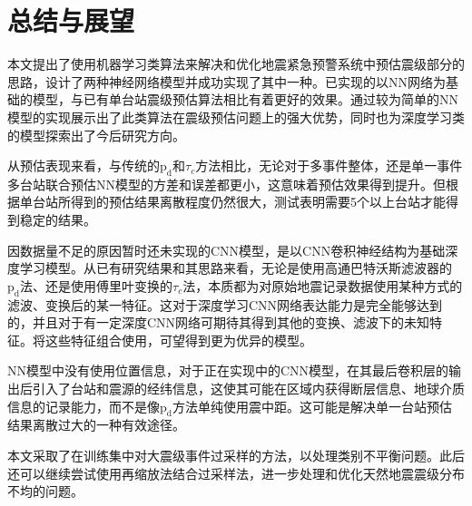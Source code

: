 \chapter{总结与展望}
\indent 本文提出了使用机器学习类算法来解决和优化地震紧急预警系统中预估震级部分的思路，设计了两种神经网络模型并成功实现了其中一种。已实现的以NN网络为基础的模型，与已有单台站震级预估算法相比有着更好的效果。通过较为简单的NN模型的实现展示出了此类算法在震级预估问题上的强大优势，同时也为深度学习类的模型探索出了今后研究方向。

\indent 从预估表现来看，与传统的$\mathrm{p}_{\mathrm{d}}$和$\tau_{c}$方法相比，无论对于多事件整体，还是单一事件多台站联合预估NN模型的方差和误差都更小，这意味着预估效果得到提升。但根据单台站所得到的预估结果离散程度仍然很大，测试表明需要5个以上台站才能得到稳定的结果。

\indent 因数据量不足的原因暂时还未实现的CNN模型，是以CNN卷积神经结构为基础深度学习模型。从已有研究结果和其思路来看，无论是使用高通巴特沃斯滤波器的$\mathrm{p}_{\mathrm{d}}$法、还是使用傅里叶变换的$\tau_{c}$法，本质都为对原始地震记录数据使用某种方式的滤波、变换后的某一特征。这对于深度学习CNN网络表达能力是完全能够达到的，并且对于有一定深度CNN网络可期待其得到其他的变换、滤波下的未知特征。将这些特征组合使用，可望得到更为优异的模型。

\indent NN模型中没有使用位置信息，对于正在实现中的CNN模型，在其最后卷积层的输出后引入了台站和震源的经纬信息，这使其可能在区域内获得断层信息、地球介质信息的记录能力，而不是像$\mathrm{p}_{\mathrm{d}}$方法单纯使用震中距。这可能是解决单一台站预估结果离散过大的一种有效途径。

\indent 本文采取了在训练集中对大震级事件过采样的方法，以处理类别不平衡问题。此后还可以继续尝试使用再缩放法结合过采样法，进一步处理和优化天然地震震级分布不均的问题。



